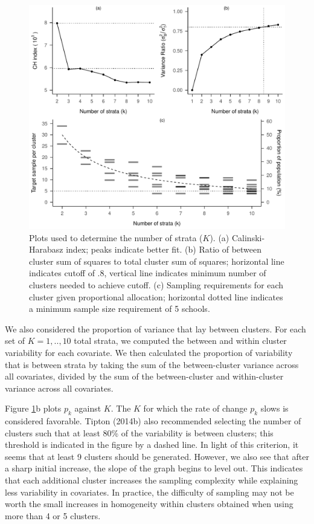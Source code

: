 \documentclass[
  man,floatsintext]{apa6}
\begin{document}
\begin{figure}[tbp]
\includegraphics[width=1\linewidth]{6---Paper_files/figure-latex/fig-k-plots-1} \caption{Plots used to determine the number of strata (\(K\)). (a) Calinski-Harabasz index; peaks indicate better fit. (b) Ratio of between cluster sum of squares to total cluster sum of squares; horizontal line indicates cutoff of .8, vertical line indicates minimum number of clusters needed to achieve cutoff. (c) Sampling requirements for each cluster given proportional allocation; horizontal dotted line indicates a minimum sample size requirement of 5 schools. }\label{fig:fig-k-plots}
\end{figure}

We also considered the proportion of variance that lay between clusters. For each set of \(K = 1,..,10\) total strata, we computed the between and within cluster variability for each covariate. We then calculated the proportion of variability that is between strata by taking the sum of the between-cluster variance across all covariates, divided by the sum of the between-cluster and within-cluster variance across all covariates.

Figure \ref{fig:fig-k-plots}b plots \(p_k\) against \(K\). The \(K\) for which the rate of change \(p_k\) slows is considered favorable. Tipton (2014b) also recommended selecting the number of clusters such that at least 80\% of the variability is between clusters; this threshold is indicated in the figure by a dashed line. In light of this criterion, it seems that at least 9 clusters should be generated. However, we also see that after a sharp initial increase, the slope of the graph begins to level out. This indicates that each additional cluster increases the sampling complexity while explaining less variability in covariates. In practice, the difficulty of sampling may not be worth the small increases in homogeneity within clusters obtained when using more than 4 or 5 clusters.
\end{document}
